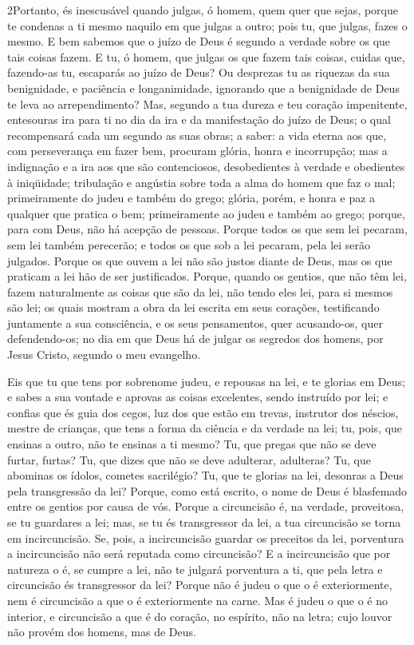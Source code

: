 \lettrine{2} Portanto, és inescusável quando julgas, ó homem,
quem quer que sejas, porque te condenas a ti mesmo naquilo em que
julgas a outro; pois tu, que julgas, fazes o mesmo. E bem
sabemos que o juízo de Deus é segundo a verdade sobre os que tais
coisas fazem. E tu, ó homem, que julgas os que fazem tais
coisas, cuidas que, fazendo-as tu, escaparás ao juízo de Deus?
Ou desprezas tu as riquezas da sua benignidade, e paciência e
longanimidade, ignorando que a benignidade de Deus te leva ao
arrependimento? Mas, segundo a tua dureza e teu coração
impenitente, entesouras ira para ti no dia da ira e da manifestação
do juízo de Deus; o qual recompensará cada um segundo as suas
obras; a saber: a vida eterna aos que, com perseverança em fazer
bem, procuram glória, honra e incorrupção; mas a indignação e a
ira aos que são contenciosos, desobedientes à verdade e obedientes à
iniqüidade; tribulação e angústia sobre toda a alma do homem que
faz o mal; primeiramente do judeu e também do grego; glória,
porém, e honra e paz a qualquer que pratica o bem; primeiramente ao
judeu e também ao grego; porque, para com Deus, não há
acepção de pessoas. Porque todos os que sem lei pecaram, sem
lei também perecerão; e todos os que sob a lei pecaram, pela lei
serão julgados. Porque os que ouvem a lei não são justos
diante de Deus, mas os que praticam a lei hão de ser justificados.
Porque, quando os gentios, que não têm lei, fazem
naturalmente as coisas que são da lei, não tendo eles lei, para si
mesmos são lei; os quais mostram a obra da lei escrita em
seus corações, testificando juntamente a sua consciência, e os seus
pensamentos, quer acusando-os, quer defendendo-os; no dia em
que Deus há de julgar os segredos dos homens, por Jesus Cristo,
segundo o meu evangelho.

Eis que tu que tens por sobrenome judeu, e repousas na lei, e te
glorias em Deus; e sabes a sua vontade e aprovas as coisas
excelentes, sendo instruído por lei; e confias que és guia
dos cegos, luz dos que estão em trevas, instrutor dos
néscios, mestre de crianças, que tens a forma da ciência e da
verdade na lei; tu, pois, que ensinas a outro, não te ensinas
a ti mesmo? Tu, que pregas que não se deve furtar, furtas?
Tu, que dizes que não se deve adulterar, adulteras? Tu, que
abominas os ídolos, cometes sacrilégio? Tu, que te glorias na
lei, desonras a Deus pela transgressão da lei? Porque, como
está escrito, o nome de Deus é blasfemado entre os gentios por causa
de vós. Porque a circuncisão é, na verdade, proveitosa, se tu
guardares a lei; mas, se tu és transgressor da lei, a tua
circuncisão se torna em incircuncisão. Se, pois, a
incircuncisão guardar os preceitos da lei, porventura a
incircuncisão não será reputada como circuncisão? E a
incircuncisão que por natureza o é, se cumpre a lei, não te julgará
porventura a ti, que pela letra e circuncisão és transgressor da
lei? Porque não é judeu o que o é exteriormente, nem é
circuncisão a que o é exteriormente na carne. Mas é judeu o
que o é no interior, e circuncisão a que é do coração, no espírito,
não na letra; cujo louvor não provém dos homens, mas de Deus.

